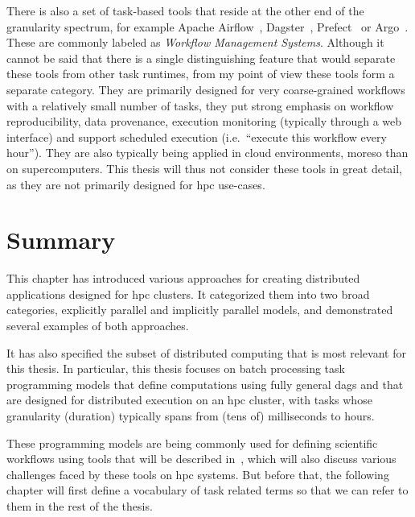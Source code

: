 There is also a set of task-based tools that reside at the other end of the granularity spectrum,
for example Apache Airflow~\cite{airfow}, Dagster~\cite{dagster},
Prefect~\cite{prefect} or Argo~\cite{argo}. These are commonly labeled as
\emph{Workflow Management Systems}. Although it cannot be said that there is a single distinguishing feature
that would separate these tools from other task runtimes, from my point of view these tools form a
separate category. They are primarily designed for very coarse-grained workflows with a relatively
small number of tasks, they put strong emphasis on workflow reproducibility, data provenance,
execution monitoring (typically through a web interface) and support scheduled execution (i.e.\
``execute this workflow every hour''). They are also typically being applied in cloud environments,
moreso than on supercomputers. This thesis will thus not consider these tools in great detail, as
they are not primarily designed for \gls{hpc} use-cases.

\section*{Summary}
This chapter has introduced various approaches for creating distributed applications designed for
\gls{hpc} clusters. It categorized them into two broad categories, explicitly
parallel and implicitly parallel models, and demonstrated several examples of both approaches.

It has also specified the subset of distributed computing that is most relevant for this thesis. In
particular, this thesis focuses on batch processing task programming models that define
computations using fully general \glspl{dag} and that are designed for distributed
execution on an \gls{hpc} cluster, with tasks whose granularity (duration) typically
spans from (tens of) milliseconds to hours.

These programming models are being commonly used for defining scientific workflows using tools that
will be described in~\Autoref{ch:sota}, which will also discuss various challenges faced by
these tools on \gls{hpc} systems. But before that, the following chapter will first
define a vocabulary of task related terms so that we can refer to them in the rest of the thesis.
